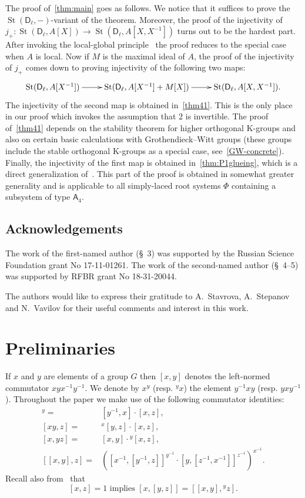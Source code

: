 \documentclass[oneside, 8pt]{amsart}
\theoremstyle{remark}
\theoremstyle{definition}
\numberwithin{lemma}{section}
\numberwithin{prop}{section}
\numberwithin{corollary}{section}
\numberwithin{externaltheorem}{section}
\DeclareMathOperator{\St}{St}
\newcommand{\inv}{^{-1}}
\newcommand{\rA}{\mathsf{A}}
\newcommand{\rD}{\mathsf{D}}
\newcommand{\rE}{\mathsf{E}}
\numberwithin{equation}{section}
\begin{document}
The proof of~\cref{thm:main} goes as follows. We notice that it suffices to prove the $\St(\rD_\ell, -)$-variant of the theorem. Moreover, the proof of the injectivity of
$j_+ \colon \St(\rD_\ell, A[X]) \to \St(\rD_\ell, A[X, X\inv])$ turns out to be the hardest part. After invoking the local-global principle~\cite[Theorem~2]{LS17} the proof reduces to the special case when $A$ is local.
Now if $M$ is the maximal ideal of $A$, the proof of the injectivity of $j_+$ comes down to proving injectivity of the following two maps:
\[ \xymatrix{ \St(\rD_\ell, A[X^{-1}]) \ar[r] & \St(\rD_\ell, A[X\inv] + M[X]) \ar[r] & \St(\rD_\ell, A[X, X\inv]). }\]
The injectivity of the second map is obtained in~\cref{thm41}. This is the only place in our proof which invokes the assumption that $2$ is invertible. The proof of~\cref{thm41} depends on the stability theorem for higher orthogonal K-groups and also on certain basic calculations with Grothendieck--Witt groups (these groups include the stable orthogonal K-groups as a special case, see~\eqref{GW-concrete}). Finally, the injectivity of the first map is obtained in~\cref{thm:P1glueing}, which is a direct generalization of~\cite[Proposition~4.3]{Tu83}. This part of the proof is obtained in somewhat greater generality and is applicable to all simply-laced root systems $\Phi$ containing a subsystem of type $\rA_4$.

\subsection{Acknowledgements} 
The work of the first-named author (\S~3) was supported by the Russian Science Foundation grant No 17-11-01261.
The work of the second-named author (\S~4--5) was supported by RFBR grant No 18-31-20044.

The authors would like to express their gratitude to A.~Stavrova, A.~Stepanov and N.~Vavilov for their useful comments and interest in this work.

\section{Preliminaries}
If $x$ and $y$ are elements of a group $G$ then $[x, y]$ denotes the left-normed commutator $xyx^{-1}y^{-1}$.
We denote by $x^y$ (resp. ${}^y\!x$) the element $y^{-1}xy$ (resp. $yxy^{-1}$). 
Throughout the paper we make use of the following commutator identities:
\begin{align}
 [x, yz]^y =& [y^{-1}, x] \cdot [x, z], \label{rel43} \\ 
 \label{eq:H1ii} [xy, z] =& {}^x[y, z] \cdot [x,z], \\
 \label{eq:H1ii-2}[x, yz] =& [x, y] \cdot {}^{y}\![x, z], \\
 [[x, y], z] =& \left([x^{-1}, [ y^{-1}, z]] ^ {y^{-1}} \cdot [y, [ z^{-1}, x^{-1}]] ^ {z^{-1}} \right)^{x^{-1}}. \label{HW-variant} \end{align}
Recall also from~\cite[Lemma~3.1.1]{RS76} that
\begin{equation} \label{eq:H1iii} [x,z] = 1 \text{ implies } [x, [y,z]] = [[x,y],{}^yz]. \end{equation} 
\end{document}
